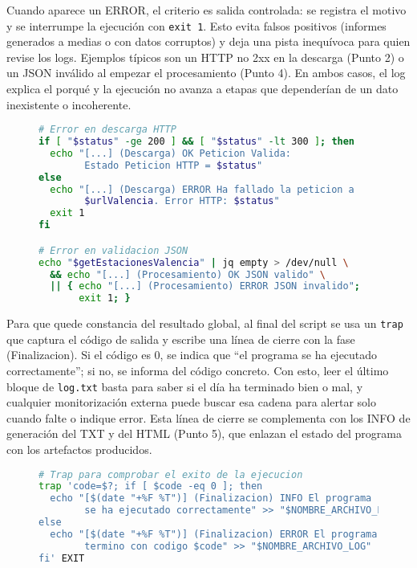 Cuando aparece un ERROR, el criterio es salida controlada: se registra el motivo y se interrumpe la ejecución con \texttt{exit 1}. Esto evita falsos positivos (informes generados a medias o con datos corruptos) y deja una pista inequívoca para quien revise los logs. Ejemplos típicos son un HTTP no 2xx en la descarga (Punto 2) o un JSON inválido al empezar el procesamiento (Punto 4). En ambos casos, el log explica el porqué y la ejecución no avanza a etapas que dependerían de un dato inexistente o incoherente.

\begin{figure}[H]
  \begin{lstlisting}[language=bash, caption={Figura 6.2 — Registro de errores con salida controlada}]
# Error en descarga HTTP
if [ "$status" -ge 200 ] && [ "$status" -lt 300 ]; then
  echo "[...] (Descarga) OK Peticion Valida: 
        Estado Peticion HTTP = $status"
else
  echo "[...] (Descarga) ERROR Ha fallado la peticion a 
        $urlValencia. Error HTTP: $status"
  exit 1
fi

# Error en validacion JSON
echo "$getEstacionesValencia" | jq empty > /dev/null \
  && echo "[...] (Procesamiento) OK JSON valido" \
  || { echo "[...] (Procesamiento) ERROR JSON invalido"; 
       exit 1; }
\end{lstlisting}
\end{figure}

Para que quede constancia del resultado global, al final del script se usa un \texttt{trap} que captura el código de salida y escribe una línea de cierre con la fase (Finalizacion). Si el código es 0, se indica que ``el programa se ha ejecutado correctamente''; si no, se informa del código concreto. Con esto, leer el último bloque de \texttt{log.txt} basta para saber si el día ha terminado bien o mal, y cualquier monitorización externa puede buscar esa cadena para alertar solo cuando falte o indique error. Esta línea de cierre se complementa con los INFO de generación del TXT y del HTML (Punto 5), que enlazan el estado del programa con los artefactos producidos.

\begin{figure}[H]
  \begin{lstlisting}[language=bash, caption={Figura 6.3 — Finalización inequívoca con trap}]
# Trap para comprobar el exito de la ejecucion
trap 'code=$?; if [ $code -eq 0 ]; then
  echo "[$(date "+%F %T")] (Finalizacion) INFO El programa 
        se ha ejecutado correctamente" >> "$NOMBRE_ARCHIVO_LOG"
else
  echo "[$(date "+%F %T")] (Finalizacion) ERROR El programa 
        termino con codigo $code" >> "$NOMBRE_ARCHIVO_LOG"
fi' EXIT
\end{lstlisting}
\end{figure}


